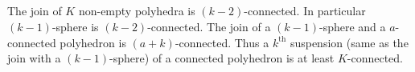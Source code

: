 \subsection{}\label{chap4-sec4.5.5}
The join of $K$ non-empty polyhedra is $(k-2)$-connected. In particular $(k-1)$-sphere is $(k-2)$-connected. The join of a $(k-1)$-sphere and a $a$-connected polyhedron is $(a+k)$-connected. Thus a $k^{\text{th}}$ suspension (same as the join with a $(k-1)$-sphere) of a connected polyhedron is at least $K$-connected.


